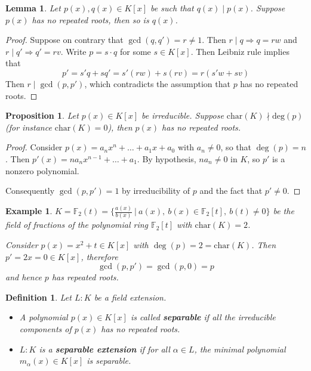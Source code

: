 \documentclass[11pt]{book}
\newtheorem{definition}[theorem]{Definition}
\newtheorem{example}[theorem]{Example}
\newtheorem{lemma}[theorem]{Lemma}
\newtheorem{proposition}[theorem]{Proposition}
\begin{document}
\begin{lemma} \label{lem-factorseparable}
Let $p(x), q(x) \in K[x]$ be such that $q(x) \mid p(x)$. Suppose $p(x)$ has no repeated roots, then so is $q(x)$.
\end{lemma}

\begin{proof}
Suppose on contrary that $\gcd(q, q') = r \neq 1$. Then $r \mid q  \Rightarrow q = rw$ and $r \mid q' \Rightarrow q'=rv$.
Write $p = s \cdot q$ for some $s \in K[x]$. Then Leibniz rule implies that
$$p' = s'q + sq' = s'(rw) + s(rv) = r(s'w+sv)$$
Then $r \mid \gcd(p, p')$, which contradicts the assumption that $p$ has no repeated roots.
\end{proof}

\begin{proposition} Let $p(x) \in K[x]$ be irreducible. Suppose $\mathrm{char}(K) \nmid \mathrm{deg}(p)$ (for instance $\mathrm{char}(K) = 0$), then $p(x)$ has no repeated roots.
\end{proposition}

\begin{proof}
Consider $p(x) = a_n x^n + \dots + a_1 x + a_0$ with $a_n \neq 0$, so that $\deg(p) = n$. Then $p'(x) = na_n x^{n-1} + \dots + a_1$. By hypothesis, $n a_n \neq 0$ in $K$, so 
$p'$ is a nonzero polynomial.

Consequently $\gcd(p,p') = 1$ by irreducibility of $p$ and the fact that $p' \neq 0$.
\end{proof}

\begin{example} \label{eg-nonsep} 
$K = \mathbb{F}_2(t) = \{ \frac{a(x)}{b(x)}\ |\ a(x),\ b(x) \in \mathbb{F}_2[t],\ b(t) \neq 0\}$ be the field of fractions of the polynomial ring $\mathbb{F}_2[t]$ with $\mathrm{char}(K) = 2$. 

Consider $p(x) = x^2 + t \in K[x]$ with $\deg(p) = 2 = \mathrm{char}(K)$. Then
$p' = 2x = 0 \in K[x]$, therefore
$$\gcd(p,p') = \gcd(p,0) = p$$
and hence $p$ has repeated roots.
\end{example}

\begin{definition} Let $L:K$ be a field extension. 
\begin{itemize}
    \item[(a)] A polynomial $p(x) \in K[x]$ is called \textbf{separable} if all the irreducible components of $p(x)$ has no repeated roots.
    \item[(b)] $L:K$ is a \textbf{ separable extension} if for all $\alpha \in L$, the minimal polynomial
    $m_{\alpha}(x) \in K[x]$
    is separable.
\end{itemize}
\end{definition}
\end{document}
